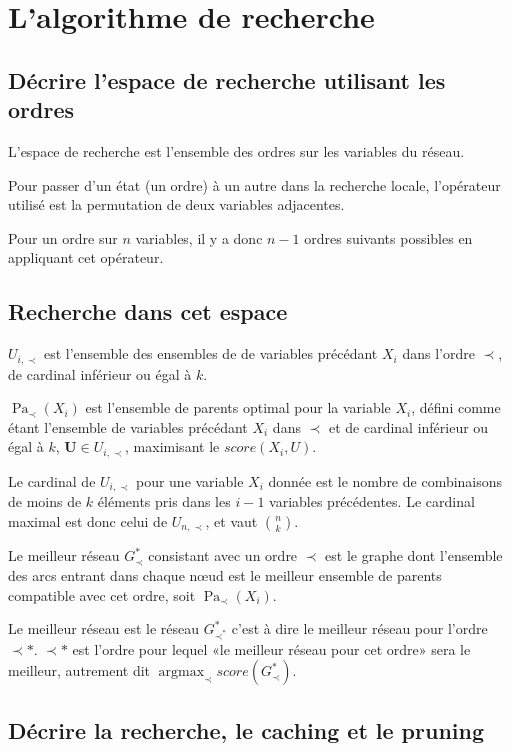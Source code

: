 \documentclass[french,a4paper]{article}
\DeclareMathOperator{\Pa}{Pa}
\DeclareMathOperator{\argmax}{argmax}
\begin{document}
\section{L'algorithme de recherche}
\subsection{Décrire l'espace de recherche utilisant les ordres}
L'espace de recherche est l'ensemble des ordres sur les variables du
réseau.

Pour passer d'un état (un ordre) à un autre dans la recherche locale,
l'opérateur utilisé est la permutation de deux variables adjacentes.

Pour un ordre sur $n$ variables, il y a donc $n-1$ ordres suivants
possibles en appliquant cet opérateur.

\subsection{Recherche dans cet espace}

$U_{i,\prec}$ est l'ensemble des ensembles de de variables précédant
$X_i$ dans l'ordre $\prec$, de cardinal inférieur ou égal à $k$.

$\Pa_\prec(X_i)$ est l'ensemble de parents optimal pour la variable
$X_i$, défini comme étant l'ensemble de variables précédant $X_i$ dans
$\prec$ et de cardinal inférieur ou égal à $k$, $\mathbf{U} \in
U_{i,\prec}$, maximisant le $score(X_i, U)$.

Le cardinal de $U_{i,\prec}$ pour une variable $X_i$ donnée est le
nombre de combinaisons de moins de $k$ éléments pris dans les $i-1$
variables précédentes. Le cardinal maximal est donc celui de
$U_{n,\prec}$, et vaut $\binom{n}{k}$.

Le meilleur réseau $G^*_\prec$ consistant avec un ordre $\prec$ est le
graphe dont l'ensemble des arcs entrant dans chaque nœud est le
meilleur ensemble de parents compatible avec cet ordre, soit
$\Pa_\prec(X_i)$.

Le meilleur réseau est le réseau $G^*_{\prec^*}$ c'est à dire le
meilleur réseau pour l'ordre $\prec*$. $\prec*$ est l'ordre pour
lequel «le meilleur réseau pour cet ordre» sera le meilleur, autrement
dit $\argmax_{\prec} score(G^*_\prec)$.

\subsection{Décrire la recherche, le caching et le pruning}
\end{document}
